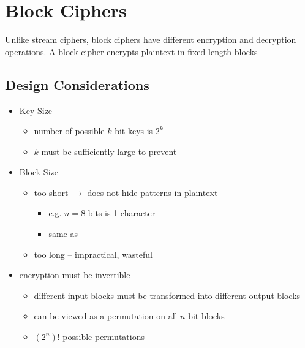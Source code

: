 \documentclass[draft]{article}
\begin{document}
\section{Block Ciphers}
\begin{multicols}{2}
    Unlike \glspl{stream cipher}, \glspl{block cipher} have different encryption and decryption operations. A block cipher encrypts plaintext in fixed-length blocks
    \subsection{Design Considerations}
    \begin{itemize}[nosep]
        \item Key Size
              \begin{itemize}[nosep]
                  \item number of possible $k$-bit keys is $2^k$
                  \item $k$ must be sufficiently large to prevent 
              \end{itemize}
        \item Block Size
              \begin{itemize}
                  \item too short $\rightarrow$ does not hide patterns in plaintext
                        \begin{itemize}
                            \item e.g. $n=8$ bits is 1 character
                            \item same as 
                        \end{itemize}
                  \item too long -- impractical, wasteful
              \end{itemize}
        \item encryption must be invertible
              \begin{itemize}
                  \item different input blocks must be transformed into different output blocks
                  \item can be viewed as a permutation on all $n$-bit blocks
                  \item $(2^n)!$ possible permutations
              \end{itemize}
    \end{itemize}
\end{multicols}
\end{document}
